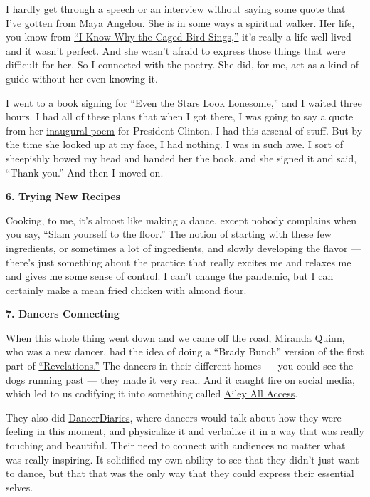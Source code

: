 I hardly get through a speech or an interview without saying some quote
that I've gotten from
\href{https://www.nytimes.com/2014/05/29/arts/maya-angelou-lyrical-witness-of-the-jim-crow-south-dies-at-86.html}{Maya
Angelou}. She is in some ways a spiritual walker. Her life, you know
from
\href{https://www.nytimes.com/2014/05/29/arts/her-face-was-a-brown-moon-that-shone-on-me.html}{``I
Know Why the Caged Bird Sings,''} it's really a life well lived and it
wasn't perfect. And she wasn't afraid to express those things that were
difficult for her. So I connected with the poetry. She did, for me, act
as a kind of guide without her even knowing it.

I went to a book signing for
\href{https://www.penguinrandomhouse.com/books/3916/even-the-stars-look-lonesome-by-maya-angelou/}{``Even
the Stars Look Lonesome,''} and I waited three hours. I had all of these
plans that when I got there, I was going to say a quote from her
\href{https://www.nytimes.com/video/books/100000002906088/maya-angelou-at-the-clinton-inauguration.html}{inaugural
poem} for President Clinton. I had this arsenal of stuff. But by the
time she looked up at my face, I had nothing. I was in such awe. I sort
of sheepishly bowed my head and handed her the book, and she signed it
and said, ``Thank you.'' And then I moved on.

\textbf{6. Trying New Recipes}

Cooking, to me, it's almost like making a dance, except nobody complains
when you say, ``Slam yourself to the floor.'' The notion of starting
with these few ingredients, or sometimes a lot of ingredients, and
slowly developing the flavor --- there's just something about the
practice that really excites me and relaxes me and gives me some sense
of control. I can't change the pandemic, but I can certainly make a mean
fried chicken with almond flour.

\textbf{7. Dancers Connecting}

When this whole thing went down and we came off the road, Miranda Quinn,
who was a new dancer, had the idea of doing a ``Brady Bunch'' version of
the first part of
\href{https://www.youtube.com/watch?v=gEFW5JznwOY}{``Revelations.''} The
dancers in their different homes --- you could see the dogs running past
--- they made it very real. And it caught fire on social media, which
led to us codifying it into something called
\href{https://www.alvinailey.org/performances-tickets/ailey-all-access}{Ailey
All Access}.

They also did
\href{https://www.youtube.com/watch?v=bOio57DuiUM\&list=PLSYS-T-WpOEUSAdXYrZw-zaZam_UMxJ7r}{DancerDiaries},
where dancers would talk about how they were feeling in this moment, and
physicalize it and verbalize it in a way that was really touching and
beautiful. Their need to connect with audiences no matter what was
really inspiring. It solidified my own ability to see that they didn't
just want to dance, but that that was the only way that they could
express their essential selves.

